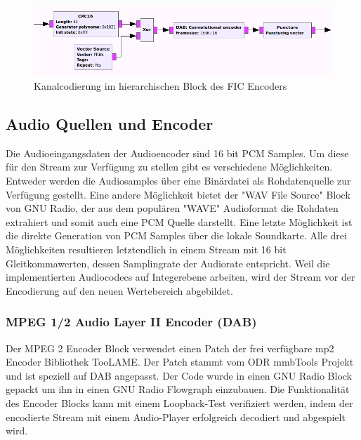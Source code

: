 \begin{figure}[ht]
\centering
  \includegraphics[width=\textwidth]{figures/FIC_encoder.png}
	\caption{Kanalcodierung im hierarchischen Block des FIC Encoders}
	\label{fig:fic_encoder}
\end{figure}

\subsection{Audio Quellen und Encoder}
Die Audioeingangsdaten der Audioencoder sind 16 bit PCM Samples. Um diese für den Stream zur Verfügung zu stellen gibt es verschiedene Möglichkeiten. Entweder werden die Audiosamples über eine Binärdatei als Rohdatenquelle zur Verfügung gestellt. Eine andere Möglichkeit bietet der "WAV File Source" Block von GNU Radio, der aus dem populären "WAVE" Audioformat die Rohdaten extrahiert und somit auch eine PCM Quelle darstellt. Eine letzte Möglichkeit ist die direkte Generation von PCM Samples über die lokale Soundkarte. Alle drei Möglichkeiten resultieren letztendlich in einem Stream mit 16 bit Gleitkommawerten, dessen Samplingrate der Audiorate entspricht. Weil die implementierten Audiocodecs auf Integerebene arbeiten, wird der Stream vor der Encodierung auf den neuen Wertebereich abgebildet.

\subsubsection{MPEG 1/2 Audio Layer II Encoder (DAB)}
Der MPEG 2 Encoder Block verwendet einen Patch der frei verfügbare mp2 Encoder Bibliothek TooLAME. Der Patch stammt vom ODR mmbTools Projekt und ist speziell auf DAB angepasst. Der Code wurde in einen GNU Radio Block gepackt um ihn in einen GNU Radio Flowgraph einzubauen. Die Funktionalität des Encoder Blocks kann mit einem Loopback-Test verifiziert werden, indem der encodierte Stream mit einem Audio-Player erfolgreich decodiert und abgespielt wird.

